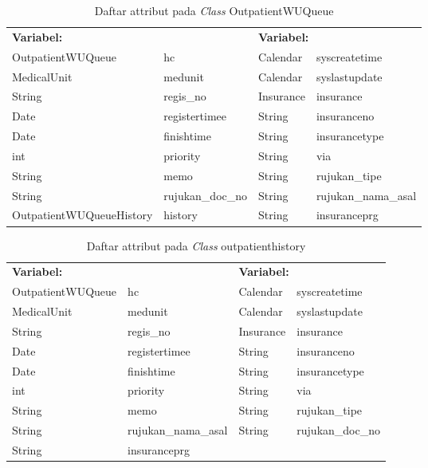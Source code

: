 \begin{table}[H]
	\caption{Daftar attribut pada \textit{Class} OutpatientWUQueue}
	\centering
	\small
	\begin{adjustbox}{width=1\textwidth}	
		\begin{tabular}{|p{4.5cm} p{2.1cm} p{2.5cm} p{3.1cm}|}
			\hline
			\multicolumn{2}{|l}{\textbf{Variabel:}}&\multicolumn{2}{l|}{\textbf{\textbf{Variabel:}}}\\
			OutpatientWUQueue&hc&Calendar&syscreatetime\\
			MedicalUnit&medunit&Calendar&syslastupdate\\
			String&regis\_no&Insurance&insurance\\
			Date&registertimee&String&insuranceno\\
			Date&finishtime&String&insurancetype\\
			int&priority&String&via\\
			String&memo&String&rujukan\_tipe\\
			String&rujukan\_doc\_no&String&rujukan\_nama\_asal\\
			OutpatientWUQueueHistory&history&String&insuranceprg\\
			\hline
		\end{tabular}
	\end{adjustbox}
\end{table}
\begin{table}[H]
	\caption{Daftar attribut pada \textit{Class} outpatienthistory}
	\centering
	\small
	\begin{adjustbox}{width=1\textwidth}	
		\begin{tabular}{|p{3.5cm} p{3.1cm} p{2.5cm} p{3.1cm}|}
			\hline
			\multicolumn{2}{|l}{\textbf{Variabel:}}&\multicolumn{2}{l|}{\textbf{\textbf{Variabel:}}}\\
			OutpatientWUQueue&hc&Calendar&syscreatetime\\
			MedicalUnit&medunit&Calendar&syslastupdate\\
			String&regis\_no&Insurance&insurance\\
			Date&registertimee&String&insuranceno\\
			Date&finishtime&String&insurancetype\\
			int&priority&String&via\\
			String&memo&String&rujukan\_tipe\\
			String&rujukan\_nama\_asal&String&rujukan\_doc\_no\\
			String&insuranceprg&&\\
			\hline
		\end{tabular}
	\end{adjustbox}
\end{table}
